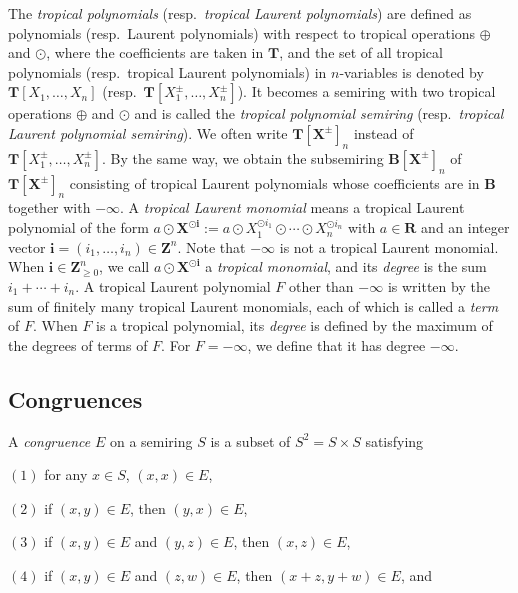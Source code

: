 \documentclass[a4paper,12pt]{amsart}
\begin{document}
The \textit{tropical polynomials} (resp.~\textit{tropical Laurent polynomials}) are defined as polynomials (resp.~Laurent polynomials) with respect to tropical operations $\oplus$ and $\odot$, where the coefficients are taken in $\boldsymbol{T}$, and the set of all tropical polynomials (resp.~tropical Laurent polynomials) in $n$-variables is denoted by $\boldsymbol{T}[X_1, \ldots, X_n]$ (resp.~$\boldsymbol{T}[X_1^{\pm}, \ldots, X_n^{\pm}]$).
It becomes a semiring with two tropical operations $\oplus$ and $\odot$ and is called the \textit{tropical polynomial semiring} (resp.~\textit{tropical Laurent polynomial semiring}).
We often write $\boldsymbol{T}[\boldsymbol{X}^{\pm}]_n$ instead of $\boldsymbol{T}[X_1^{\pm}, \ldots, X_n^{\pm}]$.
By the same way, we obtain the subsemiring $\boldsymbol{B}[\boldsymbol{X}^{\pm}]_n$ of $\boldsymbol{T}[\boldsymbol{X}^{\pm}]_n$ consisting of tropical Laurent polynomials whose coefficients are in $\boldsymbol{B}$ together with $-\infty$.
A \textit{tropical Laurent monomial} means a tropical Laurent polynomial of the form $a \odot \boldsymbol{X}^{\odot \boldsymbol{i}} := a \odot X_1^{\odot i_1} \odot \cdots \odot X_n^{\odot i_n}$ with $a \in \boldsymbol{R}$ and an integer vector $\boldsymbol{i} = (i_1, \ldots, i_n) \in \boldsymbol{Z}^n$.
Note that $-\infty$ is not a tropical Laurent monomial.
When $\boldsymbol{i} \in \boldsymbol{Z}_{\ge 0}^n$, we call $a \odot \boldsymbol{X}^{\odot \boldsymbol{i}}$ a \textit{tropical monomial}, and its \textit{degree} is the sum $i_1 + \cdots + i_n$. 
A tropical Laurent polynomial $F$ other than $-\infty$ is written by the sum of finitely many tropical Laurent monomials, each of which is called a \textit{term} of $F$.
When $F$ is a tropical polynomial, its \textit{degree} is defined by the maximum of the degrees of terms of $F$.
For $F = -\infty$, we define that it has degree $-\infty$.

\subsection{Congruences}
	\label{subsection2.2}

A \textit{congruence} $E$ on a semiring $S$ is a subset of $S^2 = S \times S$ satisfying

$(1)$ for any $x \in S$, $(x, x) \in E$,

$(2)$ if $(x, y) \in E$, then $(y, x) \in E$,

$(3)$ if $(x, y) \in E$ and $(y, z) \in E$, then $(x, z) \in E$,

$(4)$ if $(x, y) \in E$ and $(z, w) \in E$, then $(x + z, y + w) \in E$, and
\end{document}
